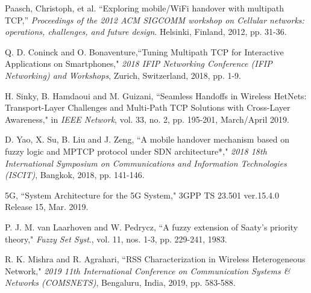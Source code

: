 \documentclass[conference]{IEEEtran}
\begin{document}
\begin{thebibliography}{00}
  Paasch, Christoph, et al. ``Exploring mobile/WiFi handover with multipath TCP,” \emph{Proceedings of the 2012 ACM SIGCOMM workshop on Cellular networks: operations, challenges, and future design}. Helsinki, Finland, 2012, pp. 31-36.

 Q. D. Coninck and O. Bonaventure,``Tuning Multipath TCP for Interactive Applications on Smartphones," \emph{2018 IFIP Networking Conference (IFIP Networking) and Workshops}, Zurich, Switzerland, 2018, pp. 1-9.


 H. Sinky, B. Hamdaoui and M. Guizani, ``Seamless Handoffs in Wireless HetNets: Transport-Layer Challenges and Multi-Path TCP Solutions with Cross-Layer Awareness," in \emph{IEEE Network}, vol. 33, no. 2, pp. 195-201, March/April 2019.

 D. Yao, X. Su, B. Liu and J. Zeng, ``A mobile handover mechanism based on fuzzy logic and MPTCP protocol under SDN architecture*," \emph{2018 18th International Symposium on Communications and Information Technologies (ISCIT)}, Bangkok, 2018, pp. 141-146.


5G, ``System Architecture for the 5G System,"
3GPP TS 23.501 ver.15.4.0 Release 15, Mar. 2019.


 P. J. M. van Laarhoven and W. Pedrycz, ``A fuzzy extension of Saaty’s priority theory," \emph{Fuzzy Set Syst}., vol. 11, nos. 1-3, pp. 229-241, 1983.
	
 R. K. Mishra and R. Agrahari, ``RSS Characterization in Wireless Heterogeneous Network," \emph{2019 11th International Conference on Communication Systems \& Networks (COMSNETS)}, Bengaluru, India, 2019, pp. 583-588.






\begin{comment}


\end{comment}
\end{thebibliography}
\end{document}
